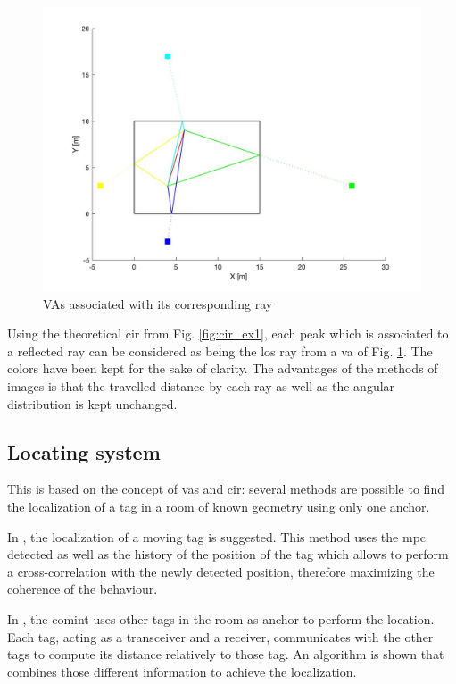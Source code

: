 \begin{figure}[H]
	\centering
	\includegraphics[width=.6\linewidth]{Images/va_map.jpg}
	\caption{VAs associated with its corresponding ray}
	\label{fig:va_room}
\end{figure}
 
Using the theoretical \gls{cir} from Fig. \ref{fig:cir_ex1}, each peak which is associated to a reflected ray can be considered as being the \gls{los} ray from a \gls{va} of Fig. \ref{fig:va_room}. The colors have been kept for the sake of clarity. The advantages of the methods of images is that the travelled distance by each ray as well as the angular distribution is kept unchanged.


\subsection{Locating system}
\label{loc_syst_mpc}

This is based on the concept of \glspl{va} and \gls{cir}: several methods are possible to find the localization of a tag in a room of known geometry using only one anchor.
\vspace{2mm}

In \cite{meissner2010mc}, the localization of a moving tag is suggested. This method uses the \gls{mpc} detected as well as the history of the position of the tag which allows to perform a cross-correlation with the newly detected position, therefore maximizing the coherence of the behaviour.
\vspace{2mm}

In \cite{froehle2013cooperative}, the \gls{comint} uses other tags in the room as anchor to perform the location. Each tag, acting as a transceiver and a receiver, communicates with the other tags to compute its distance relatively to those tag. An algorithm is shown that combines those different information to achieve the localization.
\vspace{2mm}

